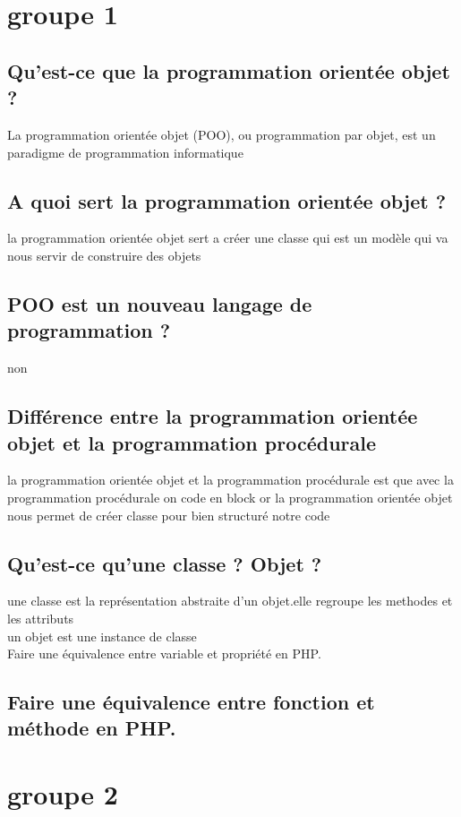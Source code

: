 \documentclass[12pt,b5paper]{article}
\author{sankara sarata}
\begin{document}
\section{groupe 1}
\subsection{Qu’est-ce que la programmation orientée objet ?}

La programmation orientée objet (POO), ou programmation par objet, est un paradigme de programmation informatique\\
\subsection{A quoi sert la programmation orientée objet ?}
la programmation orientée objet sert a créer une classe qui est un modèle qui va nous servir de construire des objets\\

\subsection{POO est un nouveau langage de programmation ?}
non\\
\subsection{Différence entre la programmation orientée objet et la programmation procédurale}
 la programmation orientée objet et la programmation procédurale est que avec la programmation procédurale on code en block or la programmation orientée objet nous permet de créer classe pour bien structuré notre code \\
\subsection{Qu’est-ce qu’une classe ? Objet ?}
une classe est la représentation abstraite d'un objet.elle regroupe les methodes et les attributs\\
un objet est une instance de classe\\
Faire une équivalence entre variable et propriété en PHP.\\
\subsection{Faire une équivalence entre fonction et méthode en PHP.}
\section{groupe 2}
\end{document}
